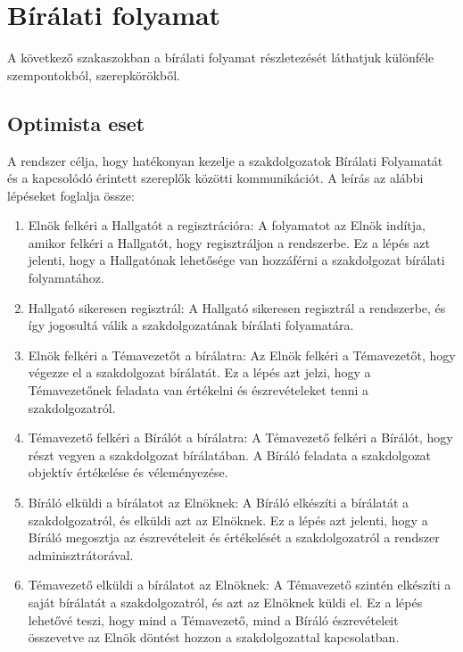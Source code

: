 \documentclass[a4paper,12pt]{article}
\begin{document}
\section{Bírálati folyamat}

A következő szakaszokban a bírálati folyamat részletezését láthatjuk különféle szempontokból, szerepkörökből.

\subsection{Optimista eset}

A rendszer célja, hogy hatékonyan kezelje a szakdolgozatok Bírálati Folyamatát és a kapcsolódó érintett szereplők közötti kommunikációt. A leírás az alábbi lépéseket foglalja össze:

\begin{enumerate}
\item Elnök felkéri a Hallgatót a regisztrációra: A folyamatot az Elnök indítja, amikor felkéri a Hallgatót, hogy regisztráljon a rendszerbe. Ez a lépés azt jelenti, hogy a Hallgatónak lehetősége van hozzáférni a szakdolgozat bírálati folyamatához.

\item Hallgató sikeresen regisztrál: A Hallgató sikeresen regisztrál a rendszerbe, és így jogosultá válik a szakdolgozatának bírálati folyamatára.

\item Elnök felkéri a Témavezetőt a bírálatra: Az Elnök felkéri a Témavezetőt, hogy végezze el a szakdolgozat bírálatát. Ez a lépés azt jelzi, hogy a Témavezetőnek feladata van értékelni és észrevételeket tenni a szakdolgozatról.

\item Témavezető felkéri a Bírálót a bírálatra: A Témavezető felkéri a Bírálót, hogy részt vegyen a szakdolgozat bírálatában. A Bíráló feladata a szakdolgozat objektív értékelése és véleményezése.

\item Bíráló elküldi a bírálatot az Elnöknek: A Bíráló elkészíti a bírálatát a szakdolgozatról, és elküldi azt az Elnöknek. Ez a lépés azt jelenti, hogy a Bíráló megosztja az észrevételeit és értékelését a szakdolgozatról a rendszer adminisztrátorával.

\item Témavezető elküldi a bírálatot az Elnöknek: A Témavezető szintén elkészíti a saját bírálatát a szakdolgozatról, és azt az Elnöknek küldi el. Ez a lépés lehetővé teszi, hogy mind a Témavezető, mind a Bíráló észrevételeit összevetve az Elnök döntést hozzon a szakdolgozattal kapcsolatban.
\end{enumerate}
\end{document}
